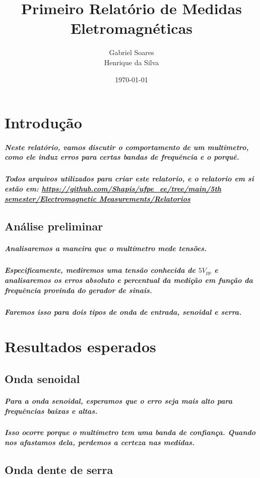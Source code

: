 \documentclass[12pt,twoside, a4paper, twocolumn]{article}
\title{Primeiro Relatório de Medidas Eletromagnéticas}
\author{Gabriel Soares \\ Henrique da Silva}
\date{\today}
\begin{document}
\maketitle
{}
\newpage
\tableofcontents
\newpage



\section{Introdução}


\subparagraph*{Neste relatório, vamos discutir o comportamento de um multímetro, como ele induz erros para certas bandas de frequência e o porquê.}

\subparagraph*{Todos arquivos utilizados para criar este relatorio, e o relatorio em si estão em:  \url{https://github.com/Shapis/ufpe_ee/tree/main/5th semester/Electromagnetic Measurements/Relatorios}}




\subsection{Análise preliminar}

\subparagraph*{Analisaremos a maneira que o multímetro mede tensões.}

\subparagraph*{Especificamente, mediremos uma tensão conhecida de $5 V_{pp}$ e analisaremos os erros absoluto e percentual da medição em função da frequência provinda do gerador de sinais.}

\subparagraph*{Faremos isso para dois tipos de onda de entrada, senoidal e serra.}

\section{Resultados esperados}

\subsection{Onda senoidal}

\subparagraph*{Para a onda senoidal, esperamos que o erro seja mais alto para frequências baixas e altas.}

\subparagraph*{Isso ocorre porque o multímetro tem uma banda de confiança. Quando nos afastamos dela, perdemos a certeza nas medidas.}

\subsection{Onda dente de serra}
\end{document}

